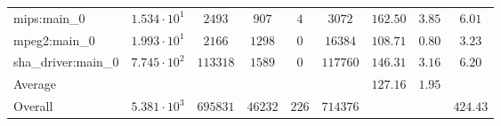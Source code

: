 \begin{tabular}{|l|c|c|c|c|c|c|c|c|}
mips:main\_0            & $ 1.534 \cdot 10^{1}  $ & $ 2493   $ & $ 907   $ & $ 4   $ & $ 3072   $ & $ 162.50      $ & $ 3.85    $ & $ 6.01    $ \\
mpeg2:main\_0           & $ 1.993 \cdot 10^{1}  $ & $ 2166   $ & $ 1298  $ & $ 0   $ & $ 16384  $ & $ 108.71      $ & $ 0.80    $ & $ 3.23    $ \\
sha\_driver:main\_0     & $ 7.745 \cdot 10^{2}  $ & $ 113318 $ & $ 1589  $ & $ 0   $ & $ 117760 $ & $ 146.31      $ & $ 3.16    $ & $ 6.20    $ \\
\hline
Average                 & $                     $ & $        $ & $       $ & $     $ & $        $ & $ 127.16      $ & $ 1.95    $ & $         $ \\
\hline
Overall                 & $ 5.381 \cdot 10^{3}  $ & $ 695831 $ & $ 46232 $ & $ 226 $ & $ 714376 $ & $             $ & $         $ & $ 424.43  $ \\
\hline
\end{tabular}
